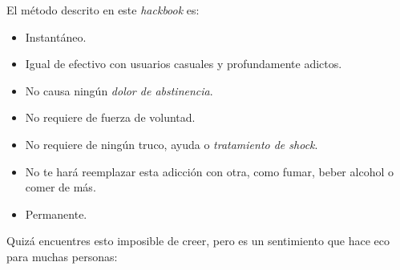 \documentclass[
  openany]{book}
\providecommand{\tightlist}{%
  \setlength{\itemsep}{0pt}\setlength{\parskip}{0pt}}
\begin{document}
El método descrito en este \emph{hackbook} es:

\begin{itemize}
\tightlist
\item
  Instantáneo.
\item
  Igual de efectivo con usuarios casuales y profundamente adictos.
\item
  No causa ningún \emph{dolor de abstinencia}.
\item
  No requiere de fuerza de voluntad.
\item
  No requiere de ningún truco, ayuda o \emph{tratamiento de shock}.
\item
  No te hará reemplazar esta adicción con otra, como fumar, beber alcohol o comer de más.
\item
  Permanente.
\end{itemize}

Quizá encuentres esto imposible de creer, pero es un sentimiento que hace eco para muchas personas:
\end{document}
